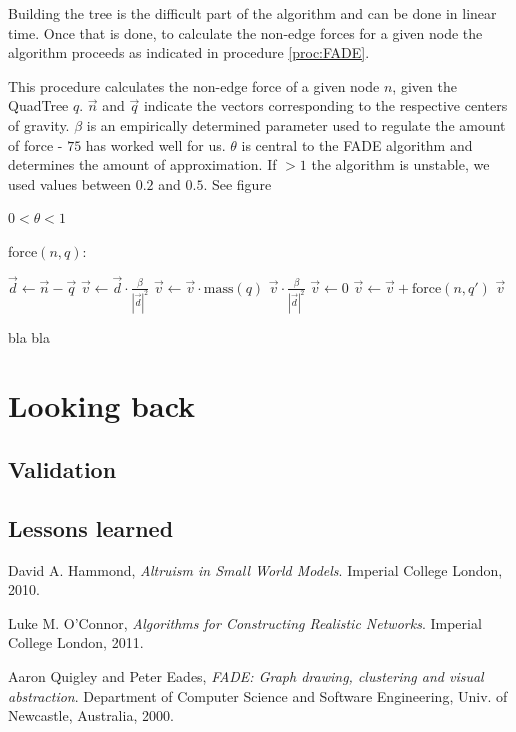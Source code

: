\documentclass[a4paper,11pt,titlepage]{article}
\let\stdsection\section         %
\renewcommand{\section}{\newpage\stdsection}
\begin{document}
Building the tree is the difficult part of the algorithm and can be done in linear time.
Once that is done, to calculate the non-edge forces for a given node the algorithm
proceeds as indicated in procedure \ref{proc:FADE}.

\begin{algorithm}
  \caption{This procedure calculates the non-edge force of a given node $n$, given the
    QuadTree $q$. $\vec{n}$ and $\vec{q}$ indicate the vectors corresponding to the
    respective centers of gravity. $\beta$ is an empirically determined parameter used
    to regulate the amount of force - $75$ has worked well for us. $\theta$ is central to
    the FADE algorithm and determines the amount of approximation. If $> 1$ the algorithm
    is unstable, we used values between $0.2$ and $0.5$. See figure }
  \label{proc:FADE}

  \begin{algorithmic}
    \REQUIRE $0 < \theta < 1$
  \end{algorithmic}
  force$(n, q)$:
  \begin{algorithmic}
    \STATE $\vec{d} \gets \vec{n} - \vec{q}$
    \STATE $\vec{v} \gets \vec{d} \cdot \frac{\beta}{|{\vec{d}}|^2}$
    \STATE $\vec{v} \gets \vec{v} \cdot \textrm{mass}(q)$
    \RETURN $\vec{v} \cdot \frac{\beta}{|{\vec{d}}|^2}$
    \ELSE
    \STATE $\vec{v} \gets 0$
    \STATE $\vec{v} \gets \vec{v} + \textrm{force}(n, q')$
    \ENDFOR
    \RETURN $\vec{v}$
    \ENDIF
  \end{algorithmic}
\end{algorithm}

bla bla

\section{Looking back}

\subsection{Validation}

\subsection{Lessons learned}

\begin{thebibliography}{9}

  David A. Hammond,
  \emph{Altruism in Small World Models}.
  Imperial College London,
  2010.

  Luke M. O’Connor,
  \emph{Algorithms for Constructing Realistic Networks}.
  Imperial College London,
  2011.

  Aaron Quigley and Peter Eades,
  \emph{FADE: Graph drawing, clustering and visual abstraction}.
  Department of Computer Science and Software Engineering,
  Univ. of  Newcastle, Australia, 2000.

\end{thebibliography}
\end{document}
